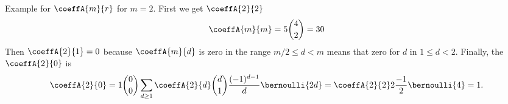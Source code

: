 \begin{examp}
    Example for $\coeffA{m}{r}$ for $m=2$.
    First we get $\coeffA{2}{2}$
    \begin{equation*}
        \coeffA{m}{m} = 5\binom{4}{2}=30
    \end{equation*}
    Then $\coeffA{2}{1} = 0$ because $\coeffA{m}{d}$ is zero in the range $m/2 \leq d < m$ means that zero for $d$ in
    $1 \leq d < 2$.
    Finally, the $\coeffA{2}{0}$ is
    \begin{equation*}
        \coeffA{2}{0} = 1 \binom{0}{0} \sum_{d \geq 1} \coeffA{2}{d} \binom{d}{1} \frac{(-1)^{d-1}}{d} \bernoulli{2d}
        = \coeffA{2}{2} 2 \frac{-1}{2} \bernoulli{4} = 1.
    \end{equation*}
\end{examp}
